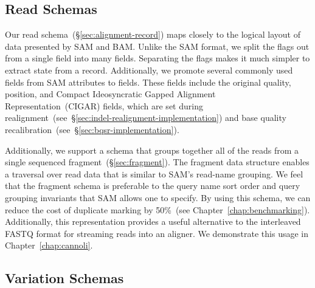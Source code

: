\documentclass[phd]{ucbthesis}
\begin{document}
\subsection{Read Schemas}
\label{sec:read-schemas}

Our read schema~(\S\ref{sec:alignment-record}) maps closely to the logical layout of data presented by
{SAM} and {BAM}. Unlike the {SAM} format, we split the
flags out from a single field into many fields. Separating the flags makes it much simpler to
extract state from a record. Additionally, we promote several commonly used
fields from {SAM} attributes to fields. These fields include the original
quality, position, and Compact Ideosyncratic Gapped Alignment Representation~(CIGAR) fields, which are set during
realignment~(see~\S\ref{sec:indel-realignment-implementation}) and base quality
recalibration~(see~\S\ref{sec:bqsr-implementation}).

Additionally, we support a schema that groups together all of the reads from a
single sequenced fragment~(\S\ref{sec:fragment}). The fragment data structure enables a traversal over read data that
is similar to {SAM}'s read-name grouping.
We feel that the fragment schema is preferable to the query name sort order and
query grouping invariants that {SAM} allows one to specify. By using this
schema, we can reduce the cost of duplicate marking by
50\%~(see Chapter~\ref{chap:benchmarking}). Additionally, this
representation provides a useful alternative to the interleaved FASTQ format for
streaming reads into an aligner. We demonstrate this usage in
Chapter~\ref{chap:cannoli}.

\subsection{Variation Schemas}
\label{sec:var-schemas}
\end{document}
